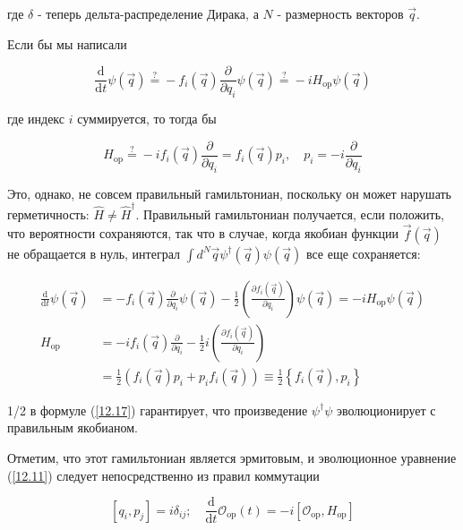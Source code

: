 \documentclass[main.tex]{subfiles}
\begin{document}
где $\delta$ - теперь дельта-распределение Дирака, а $N$ - размерность векторов $\vec q$.

Если бы мы написали

\begin{equation}\label{12.15}
	\frac{\mathrm{d}}{\mathrm{d} t} \psi(\vec{q}) \stackrel{?}{=} -f_{i}(\vec{q}) \frac{\partial}{\partial q_{i}} \psi(\vec{q}) \stackrel{?}{=} -i H_{\mathrm{op}} \psi(\vec{q})
\end{equation}

где индекс $i$ суммируется, то тогда бы

\begin{equation}\label{12.16}
	H_{\mathrm{op}} \stackrel{?}{=}-i f_{i}(\vec{q}) \frac{\partial}{\partial q_{i}}=f_{i}(\vec{q}) p_{i}, \quad p_{i}=-i \frac{\partial}{\partial q_{i}}
\end{equation}

Это, однако, не совсем правильный гамильтониан, поскольку он может нарушать герметичность: $\hat H \neq \hat H^\dagger$. Правильный гамильтониан получается, если положить, что вероятности сохраняются, так что в случае, когда якобиан функции $\vec f (\vec q)$ не обращается в нуль, интеграл $\int d^N \vec q \psi^\dagger(\vec q)\psi(\vec q)$ все еще сохраняется:

\begin{equation}\label{12.17}
	\begin{aligned} \frac{\mathrm{d}}{\mathrm{d} t} \psi(\vec{q}) &=-f_{i}(\vec{q}) \frac{\partial}{\partial q_{i}} \psi(\vec{q})-\frac{1}{2}\left(\frac{\partial f_{i}(\vec{q})}{\partial q_{i}}\right) \psi(\vec{q})=-i H_{\mathrm{op}} \psi(\vec{q}) \\ H_{\mathrm{op}} &=-i f_{i}(\vec{q}) \frac{\partial}{\partial q_{i}}-\frac{1}{2} i\left(\frac{\partial f_{i}(\vec{q})}{\partial q_{i}}\right) \\
   & =\frac{1}{2}\left(f_{i}(\vec{q}) p_{i}+p_{i} f_{i}(\vec{q})\right) \equiv \frac{1}{2}\left\{f_{i}(\vec{q}), p_{i}\right\}
    \end{aligned}
\end{equation}
           
1/2 в формуле (\ref{12.17}) гарантирует, что произведение $\psi^\dagger\psi$ эволюционирует с правильным якобианом. 

Отметим, что этот гамильтониан является эрмитовым, и эволюционное уравнение (\ref{12.11}) следует непосредственно из правил коммутации

\begin{equation}\label{12.19}
	\left[q_{i}, p_{j}\right]=i \delta_{i j} ; \quad \frac{\mathrm{d}}{\mathrm{d} t} \mathcal{O}_{\mathrm{op}}(t)=-i\left[\mathcal{O}_{\mathrm{op}}, H_{\mathrm{op}}\right]
\end{equation}
\end{document}
